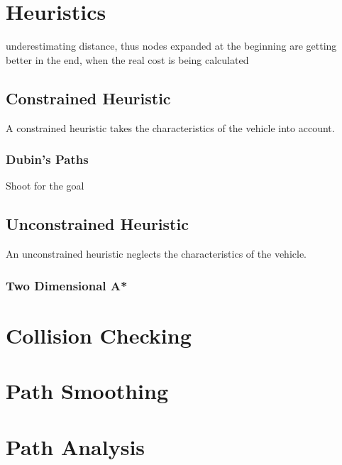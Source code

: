 \section{Heuristics}
underestimating distance, thus nodes expanded at the beginning are getting better in the end, when the real cost is being calculated
\subsection{Constrained Heuristic}
A constrained heuristic takes the characteristics of the vehicle into account.
\subsubsection{Dubin's Paths}
Shoot for the goal
\subsection{Unconstrained Heuristic}
An unconstrained heuristic neglects the characteristics of the vehicle.
\subsubsection{Two Dimensional A*}

\section{Collision Checking}

\section{Path Smoothing}

\section{Path Analysis}